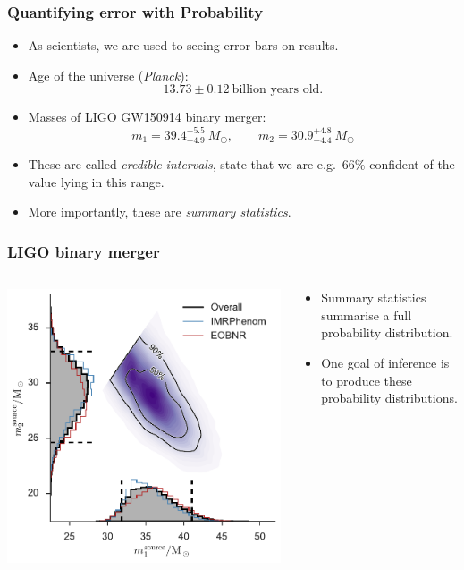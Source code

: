 \documentclass[%
]{beamer}
\begin{document}
\begin{frame}
    \frametitle{Quantifying error with Probability}

    \begin{itemize}
        \item As scientists, we are used to seeing error bars on results.
        \item Age of the universe ({\em Planck\/}): 
         \[13.73\pm 0.12\:\text{billion years old.}\]
        \item Masses of LIGO GW150914 binary merger: 
        \[m_1 = 39.4^{+5.5}_{-4.9}\:M_\odot,\qquad m_2 = 30.9^{+4.8}_{-4.4}\:M_\odot \]
        \item These are called {\em credible intervals}, state that we are e.g.\ $66\%$ confident of the value lying in this range.
        \item More importantly, these are {\em summary statistics}.
    \end{itemize}
\end{frame}

\begin{frame}
    \frametitle{LIGO binary merger}
    \begin{columns}
        \begin{column}{0.65\textwidth}
            \includegraphics[width=\textwidth]{./figures/ligo_m1_m2.pdf}
        \end{column}
        \begin{column}{0.35\textwidth}
            \begin{itemize}
                \item Summary statistics summarise a full probability distribution.
                \item One goal of inference is to produce these probability distributions.
            \end{itemize}
        \end{column}
    \end{columns}
\end{frame}
\end{document}
